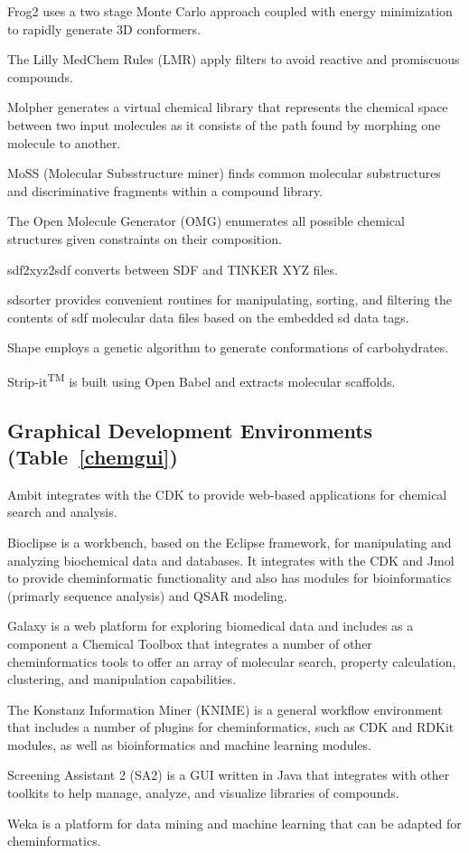 Frog2 \cite{Miteva_2010} uses a two stage Monte Carlo approach coupled with energy minimization to rapidly generate 3D conformers.

The Lilly MedChem Rules (LMR)  \cite{Bruns_2012} apply filters to avoid reactive and promiscuous compounds.

Molpher  \cite{Hoksza_2014} generates a virtual chemical library that represents the chemical space between two input molecules as it consists of the path found by morphing one molecule to another.

MoSS (Molecular Subsstructure miner) \cite{Borgelt_2005} finds common molecular substructures and discriminative fragments within a compound library.

The Open Molecule Generator (OMG) \cite{Peironcely_2012} enumerates all possible chemical structures given constraints on their composition.

sdf2xyz2sdf  \cite{Tosco_2011} converts between SDF and TINKER XYZ files.

sdsorter provides convenient routines for manipulating, sorting, and filtering the contents of sdf molecular data files based on the embedded sd data tags.

Shape \cite{Rosen_2009} employs a genetic algorithm to generate conformations of carbohydrates.

Strip-it\textsuperscript{TM} is built using Open Babel and extracts molecular scaffolds. 


\subsection*{Graphical Development Environments (Table~\ref{chemgui})} 

Ambit \cite{Jeliazkova_2011} integrates with the CDK to provide web-based applications for chemical search and analysis.

Bioclipse  \cite{Spjuth_2009} is a workbench, based on the Eclipse framework, for manipulating and analyzing biochemical data and databases. It integrates with the CDK and Jmol to provide cheminformatic functionality and also has modules for bioinformatics (primarly sequence analysis) and QSAR modeling.

Galaxy \cite{Goecks_2010} is a web platform for exploring biomedical data and includes as a component a Chemical Toolbox that integrates a number of other cheminformatics tools to offer an array of molecular search, property calculation, clustering, and manipulation capabilities.

The Konstanz Information Miner (KNIME) is a general workflow environment that includes a number of plugins for cheminformatics, such as CDK \cite{Beisken_2013} and RDKit modules, as well as bioinformatics and machine learning modules.

Screening Assistant 2 (SA2) \cite{Guilloux_2012} is a GUI written in Java that integrates with other toolkits to help manage, analyze, and visualize libraries of compounds.

Weka \cite{Hall_2009} is a platform for data mining and machine learning that can be adapted for cheminformatics.  
